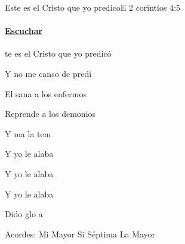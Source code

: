 \documentclass[12pt, spanish]{book}
\begin{document}
    \begin{song}{Este es el Cristo que yo predico}{E}
        {} %
        {}
        {2 corintios 4:5} %
        {}
        \ifChordBk
        \paragraph{\mbox{}\hfill\protect\href{https://open.spotify.com/intl-es/track/4EAn2z1oc7qnfuC4BqoQ1X}{Escuchar}\mbox{}\hfill}
        \fi

        \begin{SBOpGroup}
            te es el Cristo que yo predicó

            Y no me canso de predi

            El sana a los enfermos

            Reprende a los demonios

            Y ma la tem
        \end{SBOpGroup}

        \begin{SBChorus}
            Y yo le alaba

            Y yo le alaba

            Y yo le alaba

            Dido glo a 
        \end{SBChorus}

        \ifChordBk
        \begin{SBOpGroup}
            Acordes:
            \upchord{\E}\qquad Mi Mayor \hfill
            \upchord{\Bseven}\qquad Si S\'eptima \hfill\null\break
            \upchord{\A}\qquad La Mayor \hfill\null\break
        \end{SBOpGroup}
        \fi
    \end{song}
\end{document}
